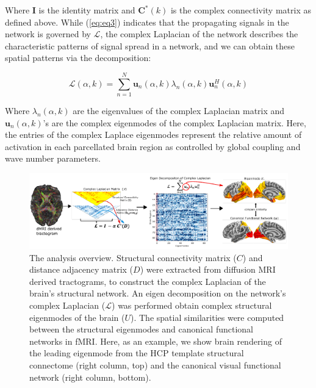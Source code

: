 Where $\pmb{I}$ is the identity matrix and $\pmb{C}^{*}(k)$ is the complex connectivity matrix as defined above. While (\ref{eq:eq3}) indicates that the propagating signals in the network is governed by $\mathcal{L}$, the complex Laplacian of the network describes the characteristic patterns of signal spread in a network, and we can obtain these spatial patterns via the decomposition:

\begin{equation}
\label{eq:eq8}
\bm{\mathcal{L}}(\alpha, k) = \sum_{n = 1}^{N} \bm{u}_{n}(\alpha, k)\lambda_{n}(\alpha, k)\bm{u}_{n}^{H}(\alpha, k)
\end{equation}

Where $\lambda_{n}(\alpha, k)$ are the eigenvalues of the complex Laplacian matrix and $\bm{u}_{n}(\alpha, k)$'s are the complex eigenmodes of the complex Laplacian matrix. Here, the entries of the complex Laplace eigenmodes represent the relative amount of activation in each parcellated brain region as controlled by global coupling and wave number parameters.

\begin{figure}[ht!]
  \centering
  \includegraphics[width=\textwidth]{../figures/chapter4/fig1_overview_v4.pdf}
  \caption{The analysis overview. Structural connectivity matrix ($C$) and distance adjacency matrix ($D$) were extracted from diffusion MRI derived tractograms, to construct the complex Laplacian of the brain's structural network. An eigen decomposition on the network's complex Laplacian ($\mathcal{L}$) was performed obtain complex structural eigenmodes of the brain ($U$). The spatial similarities were computed between the structural eigenmodes and canonical functional networks in fMRI. Here, as an example, we show brain rendering of the leading eigenmode from the HCP template structural connectome (right column, top) and the canonical visual functional network (right column, bottom).}
  \label{fig:fig1}
\end{figure}